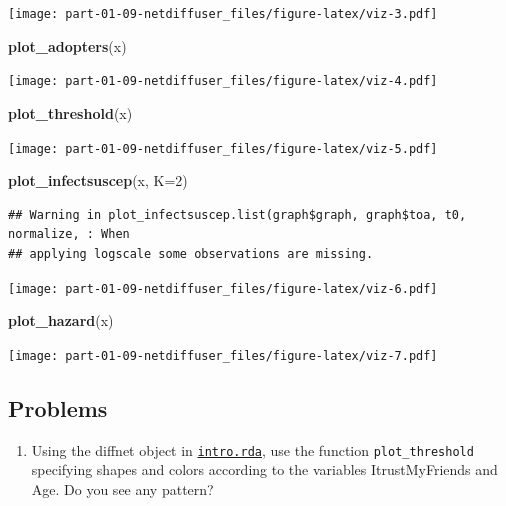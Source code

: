 \documentclass[
]{book}
\newenvironment{Shaded}{\begin{snugshade}}{\end{snugshade}}
\newcommand{\AttributeTok}[1]{\textcolor[rgb]{0.13,0.29,0.53}{#1}}
\newcommand{\DecValTok}[1]{\textcolor[rgb]{0.00,0.00,0.81}{#1}}
\newcommand{\FunctionTok}[1]{\textcolor[rgb]{0.13,0.29,0.53}{\textbf{#1}}}
\newcommand{\NormalTok}[1]{#1}
\providecommand{\tightlist}{%
  \setlength{\itemsep}{0pt}\setlength{\parskip}{0pt}}
\begin{document}
\texttt{[image: part-01-09-netdiffuser\_files/figure-latex/viz-3.pdf]}

\begin{Shaded}
\begin{Highlighting}[]
\FunctionTok{plot\_adopters}\NormalTok{(x)}
\end{Highlighting}
\end{Shaded}

\texttt{[image: part-01-09-netdiffuser\_files/figure-latex/viz-4.pdf]}

\begin{Shaded}
\begin{Highlighting}[]
\FunctionTok{plot\_threshold}\NormalTok{(x)}
\end{Highlighting}
\end{Shaded}

\texttt{[image: part-01-09-netdiffuser\_files/figure-latex/viz-5.pdf]}

\begin{Shaded}
\begin{Highlighting}[]
\FunctionTok{plot\_infectsuscep}\NormalTok{(x, }\AttributeTok{K=}\DecValTok{2}\NormalTok{)}
\end{Highlighting}
\end{Shaded}

\begin{verbatim}
## Warning in plot_infectsuscep.list(graph$graph, graph$toa, t0, normalize, : When
## applying logscale some observations are missing.
\end{verbatim}

\texttt{[image: part-01-09-netdiffuser\_files/figure-latex/viz-6.pdf]}

\begin{Shaded}
\begin{Highlighting}[]
\FunctionTok{plot\_hazard}\NormalTok{(x)}
\end{Highlighting}
\end{Shaded}

\texttt{[image: part-01-09-netdiffuser\_files/figure-latex/viz-7.pdf]}

\hypertarget{problems}{%
\subsection{Problems}\label{problems}}

\begin{enumerate}
\def\labelenumi{\arabic{enumi}.}
\tightlist
\item
  Using the diffnet object in \href{intro.rda}{\texttt{intro.rda}}, use the function \texttt{plot\_threshold} specifying
  shapes and colors according to the variables ItrustMyFriends and Age. Do you see any pattern?
\end{enumerate}
\end{document}
